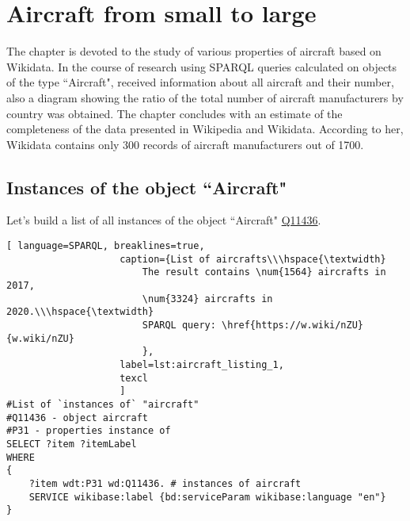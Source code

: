 \setchapterpreamble[u]{\margintoc}
\chapter{Aircraft from small to large\protect\footnotemark}


The chapter is devoted to the study of various properties of aircraft
based on Wikidata.
In the course of research using SPARQL queries calculated on objects of the type ``Aircraft",
received information about all aircraft and their number,
also a diagram showing the ratio of the total number of aircraft manufacturers by country was obtained.
The chapter concludes with an estimate of the completeness of the data presented in Wikipedia and Wikidata. According to her, Wikidata contains only
300 records of aircraft manufacturers out of \num{1700}.


\section{Instances of the object ``Aircraft"}

Let's build a list of all instances of the object ``Aircraft" \href{https://www.wikidata.org/wiki/Q11436}{Q11436}.

\begin{lstlisting}[ language=SPARQL, breaklines=true, 
                    caption={List of aircrafts\\\hspace{\textwidth}
                        The result contains \num{1564} aircrafts in 2017, 
                        \num{3324} aircrafts in 2020.\\\hspace{\textwidth}
                        SPARQL query: \href{https://w.wiki/nZU}{w.wiki/nZU}
                        },
                    label=lst:aircraft_listing_1,
                    texcl 
                    ]
#List of `instances of` "aircraft"
#Q11436 - object aircraft 
#P31 - properties instance of
SELECT ?item ?itemLabel
WHERE
{
    ?item wdt:P31 wd:Q11436. # instances of aircraft
    SERVICE wikibase:label {bd:serviceParam wikibase:language "en"}
}
\end{lstlisting}

